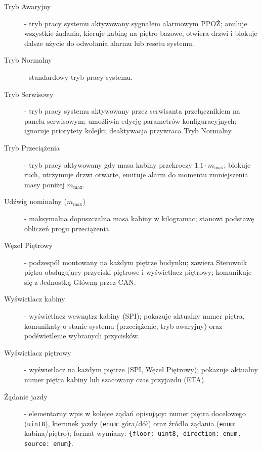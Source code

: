 \documentclass[a4paper,12pt]{article}
\begin{document}
\begin{description}
  \item[Tryb Awaryjny] - tryb pracy systemu aktywowany sygnałem alarmowym PPOŻ; anuluje wszystkie żądania, kieruje kabinę na piętro bazowe, otwiera drzwi i blokuje dalsze użycie do odwołania alarmu lub resetu systemu.

  \item[Tryb Normalny] - standardowy tryb pracy systemu.

  \item[Tryb Serwisowy] - tryb pracy systemu aktywowany przez serwisanta przełącznikiem na panelu serwisowym; umożliwia edycję parametrów konfiguracyjnych; ignoruje priorytety kolejki; deaktywacja przywraca Tryb Normalny.

  \item[Tryb Przeciążenia] - tryb pracy aktywowany gdy masa kabiny przekroczy $1.1 \cdot m_\text{max}$; blokuje ruch, utrzymuje drzwi otwarte, emituje alarm do momentu zmniejszenia masy poniżej $m_\text{max}$.


  \item[Udźwig nominalny ($m_\text{max}$)] - maksymalna dopuszczalna masa kabiny w kilogramac; stanowi podstawę obliczeń progu przeciążenia.

  \item[Węzeł Piętrowy] - podzespół montowany na każdym piętrze budynku; zawiera Sterownik piętra obsługujący przyciski piętrowe i wyświetlacz piętrowy; komunikuje się z Jednostką Główną przez CAN.

  \item[Wyświetlacz kabiny] - wyświetlacz wewnątrz kabiny (SPI); pokazuje aktualny numer piętra, komunikaty o stanie systemu (przeciążenie, tryb awaryjny) oraz podświetlenie wybranych przycisków.

  \item[Wyświetlacz piętrowy] - wyświetlacz na każdym piętrze (SPI, Węzeł Piętrowy); pokazuje aktualny numer piętra kabiny lub szacowany czas przyjazdu (ETA).

  \item[Żądanie jazdy] - elementarny wpis w kolejce żądań opisujący: numer piętra docelowego (\texttt{uint8}), kierunek jazdy (\texttt{enum}: góra/dół) oraz źródło żądania (\texttt{enum}: kabina/piętro); format wymiany: \texttt{\{floor: uint8, direction: enum, source: enum\}}.

\end{description}
\end{document}
